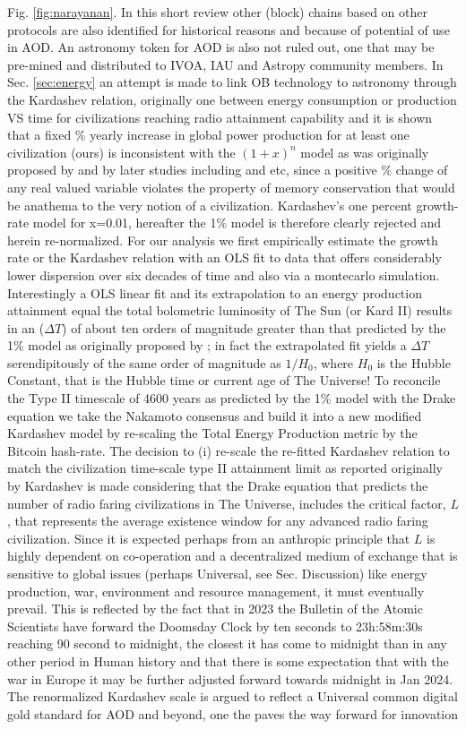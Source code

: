 \documentclass[final,5p,times,twocolumn,authoryear]{elsarticle}
\begin{document}
Fig. \ref{fig:narayanan}. In this short review other (block) chains based on other protocols are also identified for historical reasons and because of potential of use in AOD. An astronomy token for AOD is also not ruled out, one that may be pre-mined and distributed to IVOA, IAU and Astropy community members. In Sec. \ref{sec:energy} an attempt is made to link OB technology to astronomy through the Kardashev relation, originally one between energy consumption or production VS time for civilizations reaching radio attainment capability and it is shown that a fixed \% yearly increase in global power production for at least one civilization (ours) is inconsistent with the $(1+x)^{n}$ model as was originally proposed by \cite{kar64} and by later studies including \cite{sagan73} and \cite{gray2020} etc, since a positive \% change of any real valued variable violates the property of memory conservation that would be anathema to the very notion of a civilization. Kardashev's one percent growth-rate model for x=0.01, hereafter the 1\% model is therefore clearly rejected and herein re-normalized. For our analysis we first empirically estimate the growth rate or the Kardashev relation with an OLS fit to data that offers considerably lower dispersion over six decades of time and also via a montecarlo simulation. Interestingly a OLS linear fit and its extrapolation to an energy production attainment equal the total bolometric luminosity of The Sun (or Kard II) results in an ($\Delta T$) of about ten orders of magnitude greater than that predicted by the 1\% model as originally proposed by \cite{kar64}; in fact the extrapolated fit yields a $\Delta T$ serendipitously of the same order of magnitude as $1/H{_0}$, where $H_{0}$ is the Hubble Constant, that is the Hubble time or current age of The Universe! To reconcile the Type II timescale of 4600 years as predicted by the 1\% model with the Drake equation we take the Nakamoto consensus and build it into a new modified Kardashev model by re-scaling the Total Energy Production metric by the Bitcoin hash-rate. The decision to (i) re-scale the re-fitted Kardashev relation to match the civilization time-scale type II attainment limit as reported originally by Kardashev is made considering that the Drake equation that predicts the number of radio faring civilizations in The Universe, includes the critical factor, $L$, that represents the average existence window for any advanced radio faring civilization. Since it is expected perhaps from an anthropic principle that $L$ is highly dependent on co-operation and a decentralized medium of exchange that is sensitive to global issues (perhaps Universal, see Sec. Discussion) like energy production, war, environment and resource management, it must eventually prevail. This is reflected by the fact that in 2023 the Bulletin of the Atomic Scientists have forward the Doomsday Clock by ten seconds to 23h:58m:30s reaching 90 second to midnight, the closest it has come to midnight than in any other period in Human history and that there is some expectation that with the war in Europe it may be further adjusted forward towards midnight in Jan 2024. The renormalized Kardashev scale is argued to reflect a Universal common digital gold standard for AOD and beyond, one the paves the way forward for innovation 
\end{document}

